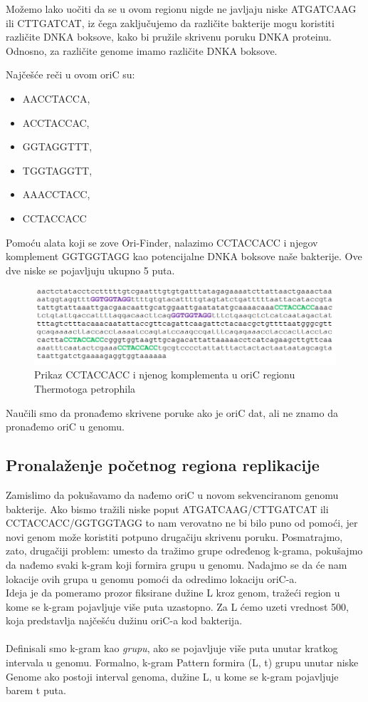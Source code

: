 Možemo lako uočiti da se u ovom regionu nigde ne javljaju niske ATGATCAAG ili CTTGATCAT, iz čega zaključujemo da različite bakterije mogu koristiti različite DNKA boksove, kako bi pružile skrivenu poruku DNKA proteinu. Odnosno, za različite genome imamo različite DNKA boksove.

Najčešće reči u ovom oriC su:
\begin{itemize}
	\item AACCTACCA, 
	\item ACCTACCAC,
	\item GGTAGGTTT,
	\item TGGTAGGTT,
	\item AAACCTACC,
	\item CCTACCACC
\end{itemize}

Pomoću alata koji se zove Ori-Finder, nalazimo CCTACCACC i njegov komplement GGTGGTAGG kao potencijalne DNKA boksove naše bakterije. Ove dve niske se pojavljuju ukupno 5 puta.

\begin{figure}[h]
\caption{Prikaz CCTACCACC i njenog komplementa u oriC regionu Thermotoga petrophila}
\centering
\includegraphics[width=1\textwidth]{poglavlja/1/slike/TP.png}
\end{figure} 
Naučili smo da pronađemo skrivene poruke ako je oriC
dat, ali ne znamo da pronađemo oriC u genomu.

\subsection{Pronalaženje početnog regiona replikacije}

Zamislimo da pokušavamo da nađemo oriC u novom sekvenciranom genomu bakterije. Ako bismo tražili niske poput ATGATCAAG/CTTGATCAT ili CCTACCACC/GGTGGTAGG to nam verovatno ne bi bilo puno od pomoći, jer novi genom može koristiti potpuno drugačiju skrivenu poruku. Posmatrajmo, zato, drugačiji problem: umesto da tražimo grupe određenog k-grama, pokušajmo da nađemo svaki k-gram koji formira grupu u genomu. Nadajmo se da će nam lokacije ovih grupa u genomu pomoći da odredimo lokaciju oriC-a.\\Ideja je da pomeramo prozor fiksirane dužine L kroz genom, tražeći region u kome se k-gram pojavljuje više puta uzastopno. Za L ćemo uzeti vrednost 500, koja predstavlja najčešću dužinu oriC-a kod bakterija. \\\\
Definisali smo k-gram kao \textit{grupu}, ako se pojavljuje više puta unutar kratkog intervala u genomu. Formalno, k-gram Pattern formira (L, t) grupu unutar niske Genome ako postoji interval genoma, dužine L, u kome se k-gram pojavljuje barem t puta. \\\\

